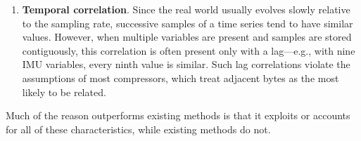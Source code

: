 \begin{enumerate}
    \item \textbf{Temporal correlation}. Since the real world usually evolves slowly relative to the sampling rate, successive samples of a time series tend to have similar values. However, when multiple variables are present and samples are stored contiguously, this correlation is often present only with a lag---e.g., with nine IMU variables, every ninth value is similar. Such lag correlations violate the assumptions of most compressors, which treat adjacent bytes as the most likely to be related.
\end{enumerate}

Much of the reason \minesp outperforms existing methods is that it exploits or accounts for all of these characteristics, while existing methods do not.
